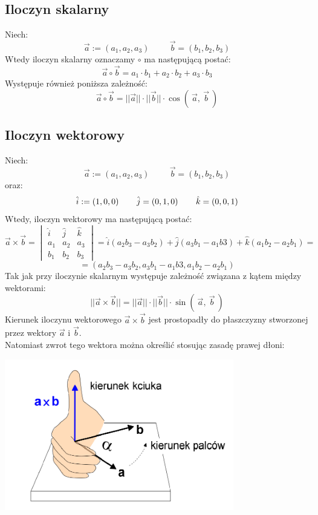 \documentclass[a4paper]{article}
\begin{document}
    \subsection{\LARGE Iloczyn skalarny}
        \Large 
        Niech:
        \[\vec{a} := (a_1, a_2, a_3) \hspace{1cm} \vec{b} = (b_1, b_2, b_3) \]
        Wtedy iloczyn skalarny oznaczamy $\circ$ ma następującą postać:
        \[\vec{a} \circ \vec{b} = a_1 \cdot b_1 + a_2 \cdot b_2 + a_3 \cdot b_3\]
        Występuje również poniższa zależność:
         \[\vec{a} \circ \vec{b} = ||\vec{a}|| \cdot ||\vec{b}|| \cdot \cos{(\ \vec{a},\ {\vec{b}}\ )} \]
        
    \subsection{\LARGE Iloczyn wektorowy}
        \Large 
        Niech:
        \[\vec{a} := (a_1, a_2, a_3) \hspace{1cm} \vec{b} = (b_1, b_2, b_3) \]
        oraz:      
        \[\hat{i} := (1, 0, 0) \hspace{0,75cm} \hat{j} = (0, 1, 0) \hspace{0,75cm} \hat{k} = (0, 0, 1) \]
        Wtedy, iloczyn wektorowy ma następującą postać:
        \[
            \vec{a} \times \vec{b} = 
            \begin{vmatrix}
                \hat{i} & \hat{j} & \hat{k} \\
                a_1 & a_2 & a_3 \\
                b_1 & b_2 & b_3
            \end{vmatrix}
            = \hat{i}(a_2b_3 - a_3b_2) + \hat{j}(a_3b_1 - a_1b3) + \hat{k}(a_1b_2 - a_2b_1) =     
        \]
        \[ = (a_2b_3 - a_3b_2, a_3b_1 - a_1b3, a_1b_2 - a_2b_1 )\]
        Tak jak przy iloczynie skalarnym występuje zależność związana z kątem między wektorami:
        \[||\vec{a} \times \vec{b}|| = ||\vec{a}||\cdot ||\vec{b}|| \cdot \sin{(\ \vec{a},\ {\vec{b}}\ )}\]
        Kierunek iloczynu wektorowego $\vec{a} \times \vec{b}$ jest prostopadły do płaszczyzny 
        stworzonej przez wektory $\vec{a}$ i $\vec{b}$.\\ Natomiast zwrot tego wektora można określić stosując zasadę prawej dłoni: \\
        \begin{center}
            \includegraphics[width=10cm]{img/prawareka.png} 
        \end{center}
        
\end{document}
